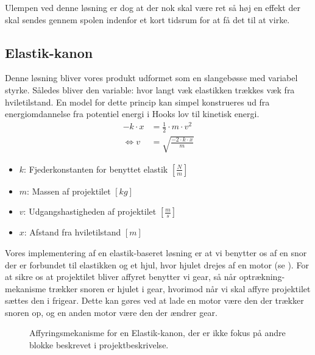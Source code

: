 Ulempen ved denne løsning er dog at der nok skal være ret så høj en effekt der skal sendes gennem spolen indenfor et kort tidsrum for at få det til at virke.

\subsection{Elastik-kanon}
Denne løsning bliver vores produkt udformet som en slangebøsse med variabel styrke. Således bliver den variable: hvor langt væk elastikken trækkes væk fra hviletilstand.
En model for dette princip kan simpel konstrueres ud fra energiomdannelse fra potentiel energi i Hooks lov til kinetisk energi.
\begin{align}
-k \cdot x &=\frac{1}{2} \cdot m \cdot v^2 \\
 \iff v	&= \sqrt{\frac{-2 \cdot k \cdot x}{m}} 
\end{align}
\begin{itemize}
	\item $k$: Fjederkonstanten for benyttet elastik $\si{[\frac{N}{m}]}$
	\item $m$: Massen af projektilet $\si{[kg]}$
	\item $v$: Udgangshastigheden af projektilet $\si{[\frac{m}{s}]}$
	\item $x$: Afstand fra hviletilstand $\si{[m]}$
\end{itemize}

Vores implementering af en elastik-baseret løsning er at vi benytter os af en snor der er forbundet til elastikken og et hjul, hvor hjulet drejes af en motor (se ). For at sikre os at projektilet bliver affyret benytter vi gear, så når optrækning-mekanisme trækker snoren er hjulet i gear, hvorimod når vi skal affyre projektilet sættes den i frigear. Dette kan gøres ved at lade en motor være den der trækker snoren op, og en anden motor være den der ændrer gear.
\begin{figure}[H] 
	\centering
	\caption{Affyringsmekanisme for en Elastik-kanon, der er ikke fokus på andre blokke beskrevet i projektbeskrivelse.}
	\label{fig:elasticshooter}
\end{figure}


